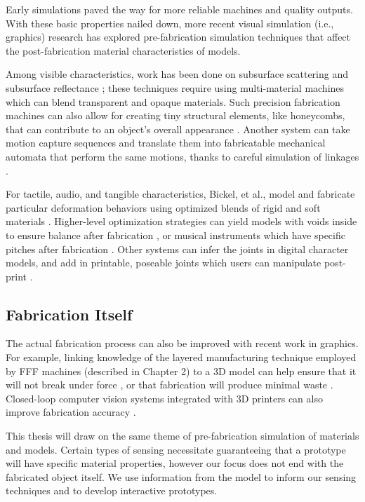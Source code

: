     Early simulations paved the way for more reliable machines and quality outputs. With these basic properties nailed down, more recent visual simulation (i.e., graphics) research has explored pre-fabrication simulation techniques that affect the post-fabrication material characteristics of models.

    Among visible characteristics, work has been done on subsurface scattering \cite{hasan-subsurface} and subsurface reflectance \cite{weyrich-reflectance}; these techniques require using multi-material machines which can blend transparent and opaque materials. Such precision fabrication machines can also allow for creating tiny structural elements, like honeycombs, that can contribute to an object's overall appearance \cite{lan-appearance}. Another system can take motion capture sequences and translate them into fabricatable mechanical automata that perform the same motions, thanks to careful simulation of linkages \cite{ceylan-automata}.

    For tactile, audio, and tangible characteristics, Bickel, et al., model and fabricate particular deformation behaviors using optimized blends of rigid and soft materials \cite{bickel-deformation}. Higher-level optimization strategies can yield models with voids inside to ensure balance after fabrication \cite{prevost-makeitstand}, or musical instruments which have specific pitches after fabrication \cite{umetani-metallophone}. Other systems can infer the joints in digital character models, and add in printable, poseable joints which users can manipulate post-print \cite{bacher-posable,cali-articulated}.

    \subsection{Fabrication Itself}

    The actual fabrication process can also be improved with recent work in graphics. For example, linking knowledge of the layered manufacturing technique employed by FFF machines (described in Chapter 2) to a 3D model can help ensure that it will not break under force \cite{umetani-strength}, or that fabrication will produce minimal waste \cite{schmidt-support}. Closed-loop computer vision systems integrated with 3D printers can also improve fabrication accuracy \cite{sithi-multifab}.

    This thesis will draw on the same theme of pre-fabrication simulation of materials and models. Certain types of sensing necessitate guaranteeing that a prototype will have specific material properties, however our focus does not end with the fabricated object itself. We use information from the model to inform our sensing techniques and to develop interactive prototypes.


